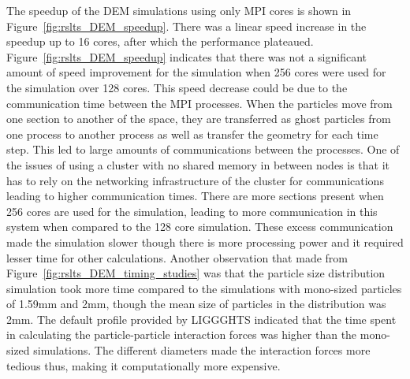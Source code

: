 \documentclass[preprint,11pt,authoryear]{elsarticle}
\begin{document}
The speedup of the DEM simulations using only MPI cores is shown in Figure~\ref{fig:rslts_DEM_speedup}.
There was a linear speed increase in the speedup up to 16 cores, after which the 
performance plateaued. Figure~\ref{fig:rslts_DEM_speedup} indicates that there 
was not a significant amount of speed improvement for the simulation when 256 cores were used for the 
simulation over 128 cores. This speed decrease could be due to the communication time between 
the MPI processes. When the particles move from one section to another of the space, they are 
transferred as ghost particles from one process to another process as well as transfer the geometry 
for each time step. This led to large amounts of communications between the processes. 
One of the issues of using a cluster with no shared memory in between nodes is that it has to 
rely on the networking infrastructure of the cluster for communications leading to higher 
communication times. There are more sections present when 256 cores are used for the 
simulation, leading to more communication in this system when compared to the 128 core simulation. 
These excess communication made the simulation slower though there is more processing power and 
it required lesser time for other calculations. Another observation that made from Figure~\ref{fig:rslts_DEM_timing_studies} was that the particle size distribution simulation took more time 
compared to the simulations with mono-sized particles of 1.59mm and 2mm, though the mean size of 
particles in the distribution was 2mm. The default profile provided by LIGGGHTS indicated that the time 
spent in calculating the particle-particle interaction forces was higher than the mono-sized 
simulations. The different diameters made the interaction forces more tedious thus, making it 
computationally more expensive. 
\end{document}
